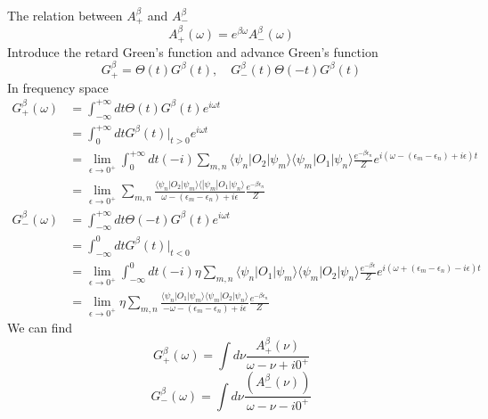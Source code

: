 \documentclass[a4paper,11pt]{article}
\begin{document}
The relation between $A_+^\beta$ and $A_-^\beta$
\begin{equation*}
  A_+^\beta(\omega)=e^{\beta\omega}A_-^\beta(\omega)
\end{equation*}
Introduce the retard Green's function and advance Green's function
\begin{equation*}
  G_+^\beta=\Theta(t)G^\beta(t),\quad G_-^\beta(t)\Theta(-t)G^\beta(t)
\end{equation*}
In frequency space
\begin{equation*}
  \begin{split}
     G_+^\beta(\omega)&=\int_{-\infty}^{+\infty}dt\Theta(t)G^\beta(t)e^{i\omega t}\\
       &=\int_{0}^{+\infty}dtG^\beta(t)|_{t>0}e^{i\omega t}\\
       &=\lim_{\epsilon\to0^+}\int_{0}^{+\infty}dt(-i)\sum_{m,n}\langle\psi_n|O_2|\psi_m\rangle\langle\psi_m|O_1|\psi_n\rangle\frac{e^{-\beta\epsilon_n}}{Z}e^{i(\omega-(\epsilon_m-\epsilon_n)+i\epsilon)t}\\
       &=\lim_{\epsilon\to0^+}\sum_{m,n}\frac{\langle\psi_n|O_2|\psi_m\rangle\langle|\psi_m|O_1|\psi_n\rangle}{\omega-(\epsilon_m-\epsilon_n)+i\epsilon}\frac{e^{-\beta\epsilon_n}}{Z}
  \end{split}
\end{equation*}
\begin{equation*}
  \begin{split}
     G_-^\beta(\omega)&=\int_{-\infty}^{+\infty}dt\Theta(-t)G^\beta(t)e^{i\omega t}\\
       &=\int_{-\infty}^{0}dtG^\beta(t)|_{t<0}\\
       &=\lim_{\epsilon\to0^+}\int_{-\infty}^{0}dt(-i)\eta\sum_{m,n}\langle\psi_n|O_1|\psi_m\rangle\langle\psi_m|O_2|\psi_n\rangle\frac{e^{-\beta\epsilon}}{Z}e^{i(\omega+(\epsilon_m-\epsilon_n)-i\epsilon)t}\\
       &=\lim_{\epsilon\to0^+}\eta\sum_{m,n}\frac{\langle\psi_n|O_1|\psi_m\rangle\langle\psi_m|O_2|\psi_n\rangle}{-\omega-(\epsilon_m-\epsilon_n)+i\epsilon}\frac{e^{-\beta\epsilon_n}}{Z}
  \end{split}
\end{equation*}
We can find
\begin{equation*}
  G_+^\beta(\omega)=\int d\nu\frac{A_+^\beta(\nu)}{\omega-\nu+i0^+}
\end{equation*}
\begin{equation*}
  G_-^\beta(\omega)=\int d\nu\frac{(A_-^\beta(\nu))}{\omega-\nu-i0^+}
\end{equation*}
\end{document}
